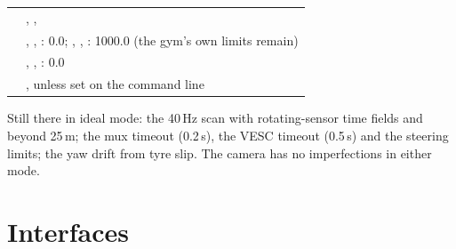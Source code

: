 \documentclass[11pt,a4paper]{article}
\begin{document}
\begin{tabularx}{\textwidth}{@{}L{3.4cm} Y@{}}
\toprule
{} &  \\
\midrule
{} & , ,  \\
 & , , : 0.0; , , : 1000.0 (the gym's own limits remain) \\
 & , , : 0.0 \\
 & , unless set on the command line \\
\bottomrule
\end{tabularx}

Still there in ideal mode: the 40\,Hz scan with rotating-sensor time fields and  beyond 25\,m; the mux timeout (0.2\,s), the VESC timeout (0.5\,s) and the steering limits; the  yaw drift from tyre slip. The camera has no imperfections in either mode.

\section{Interfaces}\label{sec:interfaces}
\end{document}
